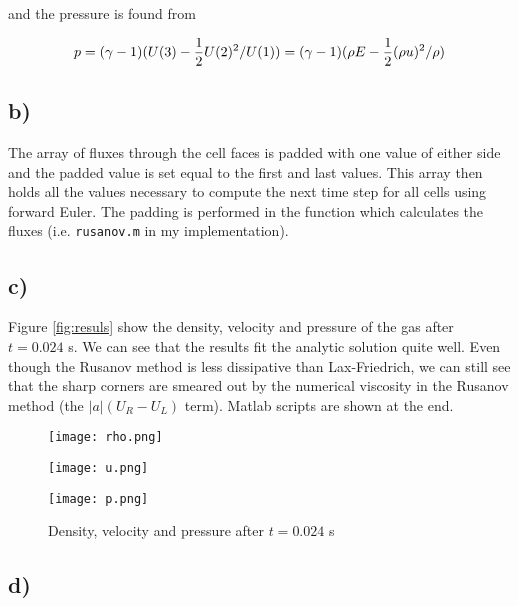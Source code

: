 \documentclass{article}
\begin{document}
and the pressure is found from 

\begin{equation}
p = (\gamma - 1) (U(3) - \frac{1}{2} U(2)^2/U(1) ) = (\gamma -1 ) (\rho E - \frac{1}{2} (\rho u)^2/\rho)
\end{equation}

\subsection{b)}
The array of fluxes through the cell faces is padded with one value of either side and the padded value is set equal to the first and last values. This array then holds all the values necessary to compute the next time step for all cells using forward Euler. The padding is performed in the function which calculates the fluxes (i.e. \texttt{rusanov.m} in my implementation).

\subsection{c)}
Figure \ref{fig:resuls} show the density, velocity and pressure of the gas after $ t = 0.024$ s. We can see that the results fit the analytic solution quite well. Even though the Rusanov method is less dissipative than Lax-Friedrich, we can still see that the sharp corners are smeared out by the numerical viscosity in the Rusanov method (the $|a|(U_R - U_L)$ term). Matlab scripts are shown at the end.

\begin{figure}
	\centering
	\begin{minipage}{0.45\textwidth}
		\texttt{[image: rho.png]}
	\end{minipage} \hfill
	\begin{minipage}{0.45\textwidth}
		\texttt{[image: u.png]}
	\end{minipage}	
	\begin{minipage}{0.45\textwidth}
		\texttt{[image: p.png]}
	\end{minipage}
	\caption{Density, velocity and pressure after $t=0.024$ s}
	\label{fig:results}
\end{figure}

\subsection{d)}
\end{document}
